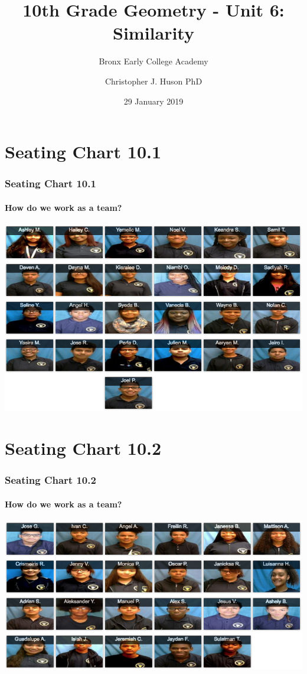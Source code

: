 \documentclass{beamer}
\title{10th Grade Geometry - Unit 6: Similarity}
\subtitle{Bronx Early College Academy}
\author{Christopher J. Huson PhD}
\date{29 January 2019}
\begin{document}
\frame{\titlepage}
\section[Outline]{}
\frame{\tableofcontents}


\section{Seating Chart 10.1}
  \frame
  {
    \frametitle{Seating Chart 10.1}
    \framesubtitle{How do we work as a team?}

    \includegraphics[width=1.05\textwidth]{seating-10A.png}
  }

\section{Seating Chart 10.2}
  \frame
  {
    \frametitle{Seating Chart 10.2}
    \framesubtitle{How do we work as a team?}

    \includegraphics[width=1.05\textwidth]{seating-10B.png}
  }
\end{document}
